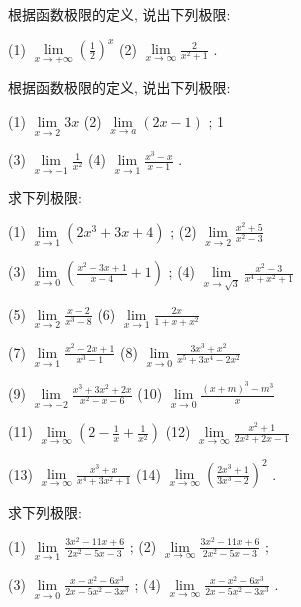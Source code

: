 \documentclass[lang=cn,newtx,12pt,scheme=chinese]{elegantbook}
\begin{document}
\begin{problemset}[习 题 二]

\item 根据函数极限的定义, 说出下列极限:

(1) \(\mathop{\lim }\limits_{{x \rightarrow + \infty }}{\left( \frac{1}{2}\right) }^{x}\) (2) \(\mathop{\lim }\limits_{{x \rightarrow \infty }}\frac{2}{{x}^{2} + 1}\) .

\item 根据函数极限的定义, 说出下列极限:

(1) \(\mathop{\lim }\limits_{{x \rightarrow 2}}{3x}\) (2) \(\mathop{\lim }\limits_{{x \rightarrow a}}\left( {{2x} - 1}\right)\) ; 1

(3) \(\mathop{\lim }\limits_{{x \rightarrow - 1}}\frac{1}{{x}^{2}}\) (4) \(\mathop{\lim }\limits_{{x \rightarrow 1}}\frac{{x}^{3} - x}{x - 1}\) .

\item 求下列极限:

(1) \(\mathop{\lim }\limits_{{x \rightarrow 1}}\left( {2{x}^{3} + {3x} + 4}\right)\) ; (2) \(\mathop{\lim }\limits_{{x \rightarrow 2}}\frac{{x}^{2} + 5}{{x}^{2} - 3}\)

(3) \(\mathop{\lim }\limits_{{x \rightarrow 0}}\left( {\frac{{x}^{2} - {3x} + 1}{x - 4} + 1}\right)\) ; (4) \(\mathop{\lim }\limits_{{x \rightarrow \sqrt{3}}}\frac{{x}^{2} - 3}{{x}^{4} + {x}^{2} + 1}\)

(5) \(\mathop{\lim }\limits_{{x \rightarrow 2}}\frac{x - 2}{{x}^{3} - 8}\) (6) \(\mathop{\lim }\limits_{{x \rightarrow 1}}\frac{2x}{1 + x + {x}^{2}}\)

(7) \(\mathop{\lim }\limits_{{x \rightarrow 1}}\frac{{x}^{2} - {2x} + 1}{{x}^{3} - 1}\) (8) \(\mathop{\lim }\limits_{{x \rightarrow 0}}\frac{3{x}^{3} + {x}^{2}}{{x}^{5} + 3{x}^{4} - 2{x}^{2}}\)

(9) \(\mathop{\lim }\limits_{{x \rightarrow - 2}}\frac{{x}^{3} + 3{x}^{2} + {2x}}{{x}^{2} - x - 6}\) (10) \(\mathop{\lim }\limits_{{x \rightarrow 0}}\frac{{\left( x + m\right) }^{3} - {m}^{3}}{x}\)

(11) \(\mathop{\lim }\limits_{{x \rightarrow \infty }}\left( {2 - \frac{1}{x} + \frac{1}{{x}^{2}}}\right)\) (12) \(\mathop{\lim }\limits_{{x \rightarrow \infty }}\frac{{x}^{2} + 1}{2{x}^{2} + {2x} - 1}\)

(13) \(\mathop{\lim }\limits_{{x \rightarrow \infty }}\frac{{x}^{3} + x}{{x}^{4} + 3{x}^{2} + 1}\) (14) \(\mathop{\lim }\limits_{{x \rightarrow \infty }}{\left( \frac{2{x}^{3} + 1}{3{x}^{3} - 2}\right) }^{2}\) .

\item 求下列极限:

(1) \(\mathop{\lim }\limits_{{x \rightarrow 1}}\frac{3{x}^{2} - {11x} + 6}{2{x}^{2} - {5x} - 3}\) ; (2) \(\mathop{\lim }\limits_{{x \rightarrow \infty }}\frac{3{x}^{2} - {11x} + 6}{2{x}^{2} - {5x} - 3}\) ;

(3) \(\mathop{\lim }\limits_{{x \rightarrow 0}}\frac{x - {x}^{2} - 6{x}^{3}}{{2x} - 5{x}^{2} - 3{x}^{3}}\) ; (4) \(\mathop{\lim }\limits_{{x \rightarrow \infty }}\frac{x - {x}^{2} - 6{x}^{3}}{{2x} - 5{x}^{2} - 3{x}^{3}}\) .
\end{problemset}
\end{document}
